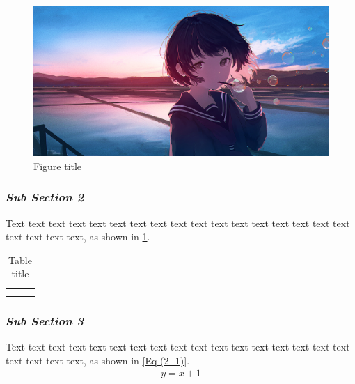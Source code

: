 \documentclass[12pt,a4paper]{article}
\numberwithin{equation}{section}
\begin{document}
{{\begin{figure}[h]
    \centering
    \includegraphics[width=1\textwidth, height=0.8\textwidth]{Fig example.png}
    \caption{Figure title}
    \label{fig:2- 1}
\end{figure}

\subsubsection{\textit{Sub Section 2}}
\hspace{2em}Text text text text text text text text text text text text text text text text text text text text text, as shown in \cref{tab:2-1}.

\renewcommand{\arraystretch}{4}
\begin{table}[htbp]
  \centering 
  \label{tab:2-1}
  \begin{tabular}{|p{5cm}|p{5cm}|p{5cm}|}
    \hline
     &  &  \\
    \hline
     &  &  \\
    \hline
     &  &  \\
    \hline
  \end{tabular}
  \caption{Table title}
\end{table}

\subsubsection{\textit{Sub Section 3}}
\hspace{2em}Text text text text text text text text text text text text text text text text text text text text text, as shown in \cref{Eq (2- 1)}.
\begin{align}
    \label{Eq (2- 1)}
    y = x + 1
\end{align}

}}
\end{document}

